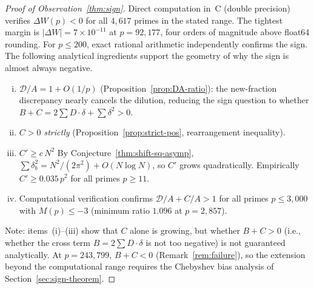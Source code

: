 \documentclass[11pt]{article}
\theoremstyle{definition}
\begin{document}
\begin{proof}[Proof of Observation~\ref{thm:sign}]
Direct computation in~C (double precision) verifies
$\Delta W(p) < 0$ for all $4{,}617$ primes in the stated
range.  The tightest margin is $|\Delta W| = 7 \times 10^{-11}$
at $p = 92{,}177$, four orders of magnitude above float64
rounding.  For $p \le 200$, exact rational arithmetic
independently confirms the sign.  The following analytical
ingredients support the geometry of why the sign is almost
always negative.

\begin{enumerate}[(i)]
\item \emph{$\mathcal{D}/A = 1 + O(1/p)$}
(Proposition~\ref{prop:DA-ratio}): the new-fraction discrepancy
nearly cancels the dilution, reducing the sign question to
whether $B + C = 2\sum D \cdot \delta + \sum \delta^2 > 0$.

\item \emph{$C > 0$ strictly}
(Proposition~\ref{prop:strict-pos}, rearrangement inequality).

\item \emph{$C' \ge c\,N^2$}
By Conjecture~\ref{thm:shift-sq-asymp},
$\sum\delta_b^2 = N^2/(2\pi^2) + O(N\log N)$,
so $C'$ grows quadratically.  Empirically $C' \ge 0.035\,p^2$
for all primes $p \ge 11$.

\item Computational verification confirms
$\mathcal{D}/A + C/A > 1$ for all primes $p \le 3{,}000$
with $M(p) \le -3$ (minimum ratio $1.096$ at $p = 2{,}857$).
\end{enumerate}

\noindent Note: items~(i)--(iii) show that $C$ alone is
growing, but whether $B + C > 0$ (i.e., whether the cross
term $B = 2\sum D \cdot \delta$ is not too negative) is
not guaranteed analytically.  At $p = 243{,}799$, $B + C < 0$
(Remark~\ref{rem:failure}), so the extension beyond the
computational range requires the Chebyshev bias analysis of
Section~\ref{sec:sign-theorem}.
\end{proof}
\end{document}
